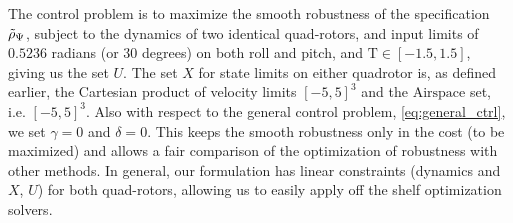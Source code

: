 The control problem is to maximize the smooth robustness of the specification $\tilde{\rho}_{\Psi}$, subject to the dynamics of two identical quad-rotors, and input limits of $0.5236$ radians (or $30$ degrees) on both roll and pitch, and $\text{T}\in[-1.5,1.5]$, giving us the set $U$. The set $X$ for state limits on either quadrotor is, as defined earlier, the Cartesian product of velocity limits $[-5,5]^3$ and the $\text{Airspace}$ set, i.e. $[-5,5]^3$. Also with respect to the general control problem, \eqref{eq:general_ctrl}, we set $\gamma=0$ and $\delta=0$. This keeps the smooth robustness only in the cost (to be maximized) and allows a fair comparison of the optimization of robustness with other methods. In general, our formulation has linear constraints (dynamics and $X$, $U$) for both quad-rotors, allowing us to easily apply off the shelf optimization solvers.

